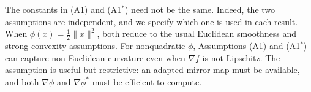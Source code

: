 \documentclass{article}
\theoremstyle{plain}
\newtheorem{theorem}{Theorem}[section]
\theoremstyle{definition}
\theoremstyle{remark}
\begin{document}
The constants in (A1) and (A1$^*$) need not be the same. Indeed, the two assumptions are independent, and we specify which one is used in each result. When $\phi(x)=\frac12\|x\|^2$, both reduce to the usual Euclidean smoothness and strong convexity assumptions. For nonquadratic $\phi$, Assumptions  (A1) and (A1$^*$) can capture non-Euclidean curvature even when $\nabla f$ is not Lipschitz. The assumption is useful but restrictive: an adapted mirror map must be available, and both $\nabla\phi$ and $\nabla\phi^*$ must be efficient to compute.

%
\end{document}
